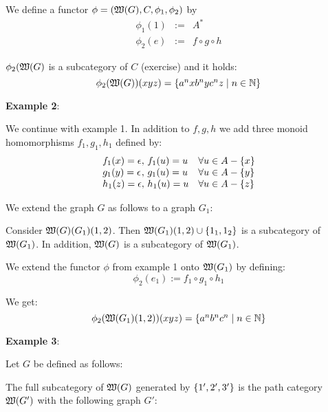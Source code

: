 We define a functor $\phi = (\mbox{$\mathfrak{W}(G)$}, C, \phi_1, \phi_2)$ by
\begin{eqnarray*}
\phi_1(1) & := & A^* \\
\phi_2(e) & := & f \circ g \circ h
\end{eqnarray*}

$\phi_2(\mbox{$\mathfrak{W}(G)$}$ is a subcategory of $C$ (exercise) and it holds:
\[ \phi_2(\mbox{$\mathfrak{W}(G)$})(xyz) = \mbox{$\{a^n x b^n y c^n z \mid n \in \mathbb{N}\}$}
\]

\bigskip
{\bf Example 2}:

We continue with example 1. In addition to $f,g,h$ we add three monoid
homomorphisms $f_1, g_1, h_1$ defined by:
\[\begin{array}{l@{,\ }l@{\quad}l}
f_1(x) = \epsilon & f_1(u) = u & \forall u \in A - \setof{x} \\
g_1(y) = \epsilon & g_1(u) = u & \forall u \in A - \setof{y} \\
h_1(z) = \epsilon & h_1(u) = u & \forall u \in A - \setof{z}
\end{array}\]

We extend the graph $G$ as follows to a graph $G_1$:

\begin{center}

\end{center}

Consider $\mbox{$\mathfrak{W}(G)$}(G_1)(1,2)$. Then $\mbox{$\mathfrak{W}(G_1)$}(1,2) \cup \mbox{$\{1_1,
1_2\}$}$ is a subcategory of $\mbox{$\mathfrak{W}(G_1)$}$. In addition, $\mbox{$\mathfrak{W}(G)$}$ is a subcategory of
$\mbox{$\mathfrak{W}(G_1)$}$.

We extend the functor $\phi$ from example 1 onto $\mbox{$\mathfrak{W}(G_1)$}$ by defining:
\[ \phi_2(e_1) := f_1 \circ g_1 \circ h_1 \]

We get:
\[ \phi_2(\mbox{$\mathfrak{W}(G_1)$}(1,2))(xyz) = \mbox{$\{a^n b^n c^n \mid n \in \mathbb{N}\}$}
\]

\bigskip
{\bf Example 3}:

Let $G$ be defined as follows:

\begin{center}

\end{center}

The full subcategory of $\mbox{$\mathfrak{W}(G)$}$ generated by $\mbox{$\{1', 2', 3'\}$}$ is the
path category $\mbox{$\mathfrak{W}(G')$}$ with the following graph $G'$:

\begin{center}

\end{center}

